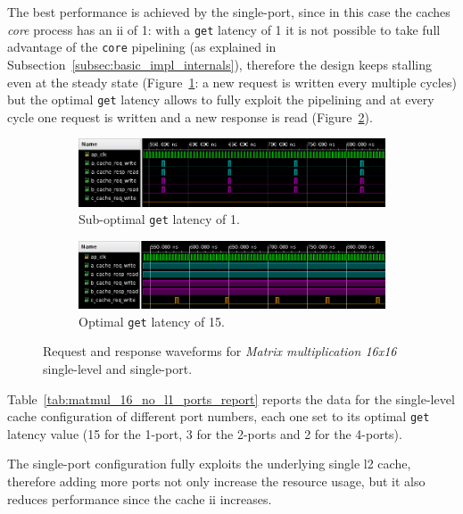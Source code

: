 \documentclass[11pt,a4paper,oneside]{memoir}
\begin{document}
The best performance is achieved by the single-port, since in this case the
caches \emph{core} process has an \ac{ii} of 1: with a \texttt{get} latency of
1 it is not possible to take full advantage of the \texttt{core} pipelining (as
explained in Subsection~\ref{subsec:basic_impl_internals}), therefore the
design keeps stalling even at the steady state
(Figure~\ref{subfig:matmul_wf_latency_1}: a new request is written every
multiple cycles) but the optimal \texttt{get} latency allows to fully exploit
the pipelining and at every cycle one request is written and a new response is
read (Figure~\ref{subfig:matmul_wf_latency_15}). 

\begin{figure}[H]
	\centering
	\begin{subfigure}[b]{.85\textwidth}
		\centering
		\includegraphics[width=\textwidth]{matmul_latency_1}
		\caption{Sub-optimal \texttt{get} latency of 1.}
		\label{subfig:matmul_wf_latency_1}
	\end{subfigure}
	\begin{subfigure}[b]{.85\textwidth}
		\centering
		\includegraphics[width=\textwidth]{matmul_latency_15}
		\caption{Optimal \texttt{get} latency of 15.}
		\label{subfig:matmul_wf_latency_15}
	\end{subfigure}
	\caption{Request and response waveforms for \emph{Matrix multiplication
	16x16} single-level and single-port.}
	\label{fig:matmul_wf}
\end{figure}

Table~\ref{tab:matmul_16_no_l1_ports_report} reports the data for the
single-level cache configuration of different port numbers, each one set to its
optimal \texttt{get} latency value (15 for the 1-port, 3 for the 2-ports and 2
for the 4-ports).

The single-port configuration fully exploits the underlying single \ac{l2} cache,
therefore adding more ports not only increase the resource usage, but it also
reduces performance since the cache \ac{ii} increases.
\end{document}
